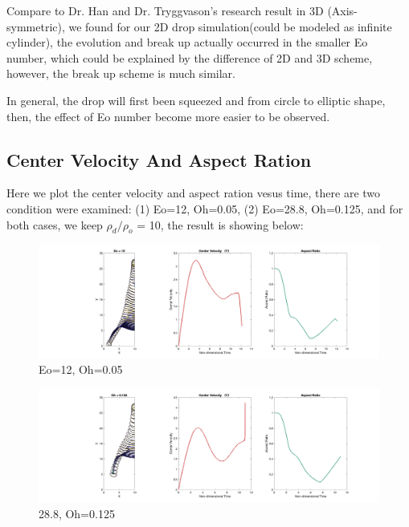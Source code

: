 \documentclass[12pt]{article}
\begin{document}
Compare to Dr. Han and Dr. Tryggvason's research result in 3D (Axis-symmetric), we found for our 2D drop simulation(could be modeled as infinite cylinder), the evolution and break up actually occurred in the smaller Eo number, which could be explained by the difference of 2D and 3D scheme, however, the break up scheme is much similar.









In general, the drop will first been squeezed and from circle to elliptic shape, then, the effect of Eo number become more easier to be observed. 








\subsection{Center Velocity And Aspect Ration}



Here we plot the center velocity and aspect ration vesus time, there are two condition were examined:  (1) Eo=12, Oh=0.05, (2) Eo=28.8, Oh=0.125, and for both cases, we keep $\rho_d/\rho_o$ = 10, the result is showing below:


\begin{figure}[H]
    \centering
    \includegraphics[width=\textwidth]{Latex/figures/All_Eo=12__t=0.28.png}
    \caption{Eo=12, Oh=0.05}
    \label{deformation}
\end{figure}



\begin{figure}[H]
    \centering
    \includegraphics[width=\textwidth]{Latex/figures/All_Oh=1.25_t=0.44.png}
    \caption{28.8, Oh=0.125}
    \label{deformation}
\end{figure}
\end{document}

